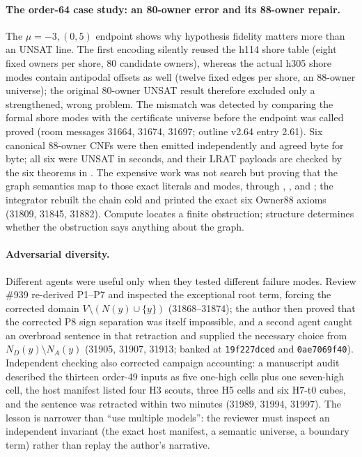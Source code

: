 \documentclass{anvil-paper}
\theoremstyle{definition}
\begin{document}
\paragraph{The order-64 case study: an 80-owner error and its 88-owner repair.} The $\mu=-3,(0,5)$ endpoint shows why hypothesis fidelity matters more than an UNSAT line. The first encoding silently reused the h114 shore table (eight fixed owners per shore, 80 candidate owners), whereas the actual h305 shore modes contain antipodal offsets as well (twelve fixed edges per shore, an 88-owner universe); the original 80-owner UNSAT result therefore excluded only a strengthened, wrong problem. The mismatch was detected by comparing the formal shore modes with the certificate universe before the endpoint was called proved (room messages 31664, 31674, 31697; outline v2.64 entry 2.61). Six canonical 88-owner CNFs were then emitted independently and agreed byte for byte; all six were UNSAT in seconds, and their LRAT payloads are checked by the six  theorems in . The expensive work was not search but proving that the graph semantics map to those exact literals and modes, through , ,  and ; the integrator rebuilt the chain cold and printed the exact six Owner88 axioms (31809, 31845, 31882). Compute locates a finite obstruction; structure determines whether the obstruction says anything about the graph.

\paragraph{Adversarial diversity.} Different agents were useful only when they tested different failure modes. Review \#939 re-derived P1--P7 and inspected the exceptional root term, forcing the corrected domain $V\setminus(N(y)\cup\{y\})$ (31868--31874); the author then proved that the corrected P8 sign separation was itself impossible, and a second agent caught an overbroad sentence in that retraction and supplied the necessary choice from $N_D(y)\setminus N_A(y)$ (31905, 31907, 31913; banked at \texttt{19f227dced} and \texttt{0ae7069f40}). Independent checking also corrected campaign accounting: a manuscript audit described the thirteen order-49 inputs as five one-high cells plus one seven-high cell, the host manifest listed four H3 scouts, three H5 cells and six H7-t0 cubes, and the sentence was retracted within two minutes (31989, 31994, 31997). The lesson is narrower than ``use multiple models'': the reviewer must inspect an independent invariant (the exact host manifest, a semantic universe, a boundary term) rather than replay the author's narrative.
\end{document}
